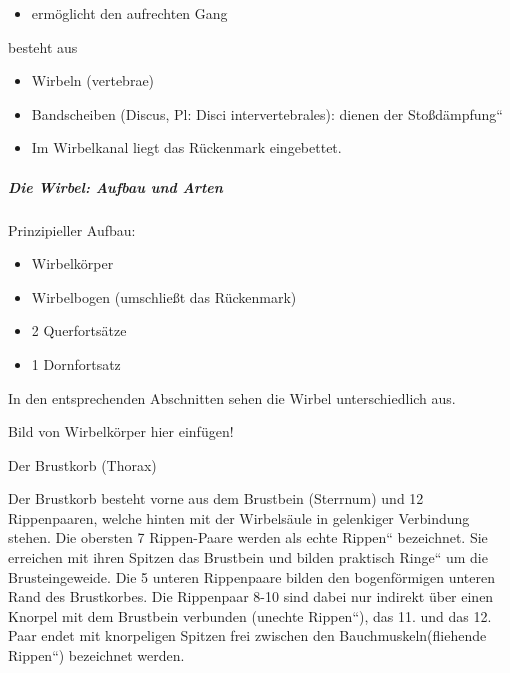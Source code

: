 \documentclass{article}
\begin{document}
\begin{itemize}
\item erm\"oglicht den aufrechten Gang

\end{itemize}
besteht aus

\begin{itemize}
\item Wirbeln (vertebrae)

\item {}Bandscheiben (Discus, Pl: Disci
intervertebrales): dienen der
{\quotedblbase}Sto{\ss}d\"ampfung{\textquotedblleft}

\item Im Wirbelkanal liegt das R\"uckenmark eingebettet.

\end{itemize}
\subparagraph{Die Wirbel: Aufbau und Arten}
Prinzipieller Aufbau:

\begin{itemize}
\item Wirbelk\"orper

\item Wirbelbogen  (umschlie{\ss}t das R\"uckenmark)

\item 2 Querforts\"atze

\item 1 Dornfortsatz

\end{itemize}
%
%
In den entsprechenden Abschnitten sehen die Wirbel unterschiedlich aus. 

Bild von Wirbelk\"orper hier einf\"ugen!

Der Brustkorb (Thorax)

Der  Brustkorb besteht vorne aus dem Brustbein (Sterrnum) und 12
Rippenpaaren, welche hinten mit der Wirbels\"aule in gelenkiger
Verbindung stehen. Die obersten 7 Rippen-Paare werden als 
{\quotedblbase}echte Rippen{\textquotedblleft} bezeichnet. Sie
erreichen mit ihren Spitzen das Brustbein und bilden praktisch
{\quotedblbase}Ringe{\textquotedblleft} um die Brusteingeweide. Die 5
unteren Rippenpaare bilden den bogenf\"ormigen unteren Rand des
Brustkorbes. Die Rippenpaar 8-10 sind dabei nur indirekt \"uber einen
Knorpel mit dem Brustbein verbunden ({\quotedblbase}unechte
Rippen{\textquotedblleft}), das 11. und das 12. Paar endet mit
knorpeligen Spitzen frei zwischen den
Bauchmuskeln({\quotedblbase}fliehende Rippen{\textquotedblleft})
bezeichnet werden.
\end{document}

